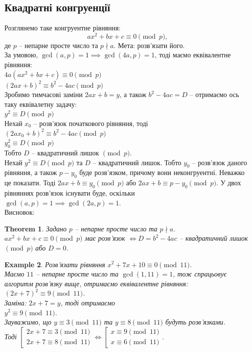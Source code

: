 \documentclass[a4paper, 10pt]{article}
\theoremstyle{theoremdd}
\newtheorem{theorem}{Theorem}[subsection]
\theoremstyle{theoremdd}
\theoremstyle{theoremdd}
\theoremstyle{theoremdd}
\newtheorem{example}[theorem]{Example}
\theoremstyle{theoremdd}
\theoremstyle{theoremdd}
\theoremstyle{theoremdd}
\theoremstyle{theoremdd}
\begin{document}
\subsection{Квадратні конгруенції}
Розглянемо таке конгруентне рівняння:
$$ ax^2+bx+c \equiv 0 \pmod p,$$
де $p$ -- непарне просте число та $p \nmid a$. Мета: розв'язати його.\\
За умовою, $\gcd(a,p) = 1 \implies \gcd(4a,p) = 1$, тоді маємо еквівалентне рівняння:\\
$4a(ax^2+bx+c) \equiv 0 \pmod p$\\
$(2ax+b)^2 \equiv b^2-4ac \pmod p$\\
Зробимо тимчасові заміни $2ax+b = y$, а також $b^2-4ac = D$ -- отримаємо ось таку еквівалетну задачу:\\
$y^2 \equiv D \pmod p$
\bigskip \\
Нехай $x_0$ -- розв'язок початкового рівняння, тоді\\
$(2ax_0+b)^2 \equiv b^2 - 4ac \pmod p$\\
$y_0^2 \equiv D \pmod p$\\
Тобто $D$ -- квадратичний лишок $\!\! \pmod p$.
\bigskip \\
Нехай $y^2 \equiv D \pmod p$ та $D$ -- квадратичний лишок. Тобто $y_0$ -- розв'язок даного рівняння, а також $p-y_0$ буде розв'язком, причому вони неконгруентні. Неважко це показати. Тоді $2ax+b \equiv y_0 \pmod p$ або $2ax+b \equiv p-y_0 \pmod p$. У двох рівняннях розв'язок існувати буде, оскільки $\gcd(a,p) = 1 \implies \gcd(2a,p) = 1$.\\
Висновок:
\begin{theorem}
Задано $p$ -- непарне просте число та $p \nmid a$.\\
$ax^2+bx+c \equiv 0 \pmod p$ має розв'язок $\iff D = b^2-4ac$ -- квадратичний лишок $\pmod p$ або $D = 0$.
\end{theorem}

\begin{example}
Розв'язати рівняння $x^2+7x+10 \equiv 0 \pmod {11}$.\\
Маємо $11$ -- непарне просте число та $\gcd(1,11) = 1$, тож спрацьовує алгоритм розв'язку вище, отримаємо еквівалентне рівняння:\\
$(2x+7)^2 \equiv 9 \pmod {11}$.\\
Заміна: $2x+7 = y$, тоді отримаємо\\
$y^2 \equiv 9 \pmod {11}$.\\
Зауважимо, що $y \equiv 3 \pmod {11}$ та $y \equiv 8 \pmod {11}$ будуть розв'язками.\\
Тоді $\left[ \begin{gathered} 2x+7 \equiv 3 \pmod {11} \\ 2x+7 \equiv 8 \pmod {11} \end{gathered} \right. \iff \left[ \begin{gathered} x \equiv 9 \pmod {11} \\ x \equiv 6 \pmod {11} \end{gathered} \right.$.
\end{example}
\newpage
\end{document}
